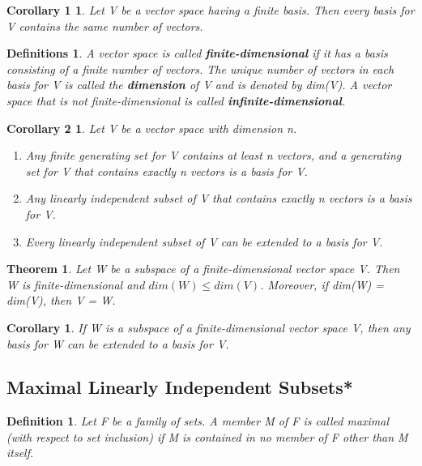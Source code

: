 \documentclass{article}
\newcommand{\bd}[1]{\textbf{#1}}
\theoremstyle{plain}
\newtheorem{theorem}{Theorem}[section]
\newtheorem*{corollary}{Corollary}
\newtheorem*{corollary1}{Corollary 1}
\newtheorem*{corollary2}{Corollary 2}
\newtheorem*{definition1}{Definition}
\newtheorem*{definitions}{Definitions}
\theoremstyle{plain} %
\begin{document}
\begin{corollary1}
Let V be a vector space having a finite basis. Then every basis for V contains the same number of vectors.
\end{corollary1}

\begin{definitions}
A vector space is called \bd{finite-dimensional} if it has a basis consisting of a finite number of vectors. The unique number of vectors in each basis for V is called the \bd{dimension} of V and is denoted by dim(V). A vector space that is not finite-dimensional is called \bd{infinite-dimensional}.
\end{definitions}

\begin{corollary2}
Let V be a vector space with dimension n.
\begin{enumerate}[label=(\alph*)]
\item Any finite generating set for V contains at least n vectors, and a generating set for V that contains exactly n vectors is a basis for V.
\item Any linearly independent subset of V that contains exactly n vectors is a basis for V.
\item Every linearly independent subset of V can be extended to a basis for V.
\end{enumerate}
\end{corollary2}

\begin{theorem}
Let W be a subspace of a finite-dimensional vector space V. Then W is finite-dimensional and $dim(W) \leq dim(V)$. Moreover, if dim(W) = dim(V), then V = W.
\end{theorem}

\begin{corollary}
If W is a subspace of a finite-dimensional vector space V, then any basis for W can be extended to a basis for V.
\end{corollary}

\subsection{Maximal Linearly Independent Subsets*}

\begin{definition1}
Let F be a family of sets. A member M of F is called maximal (with respect to set inclusion) if M is contained in no member of F other than M itself.
\end{definition1}
\end{document}
